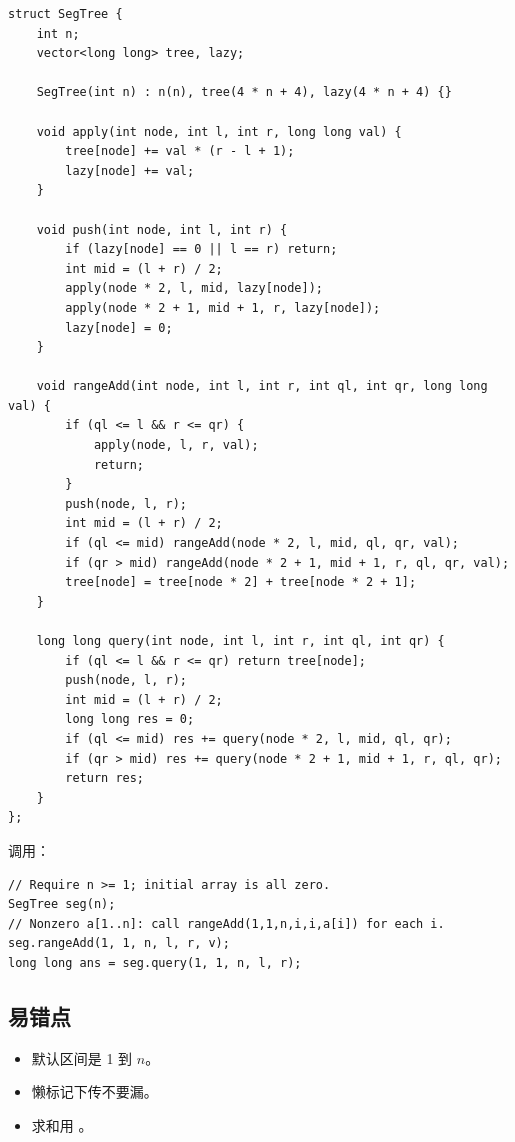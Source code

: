 \begin{lstlisting}
struct SegTree {
    int n;
    vector<long long> tree, lazy;

    SegTree(int n) : n(n), tree(4 * n + 4), lazy(4 * n + 4) {}

    void apply(int node, int l, int r, long long val) {
        tree[node] += val * (r - l + 1);
        lazy[node] += val;
    }

    void push(int node, int l, int r) {
        if (lazy[node] == 0 || l == r) return;
        int mid = (l + r) / 2;
        apply(node * 2, l, mid, lazy[node]);
        apply(node * 2 + 1, mid + 1, r, lazy[node]);
        lazy[node] = 0;
    }

    void rangeAdd(int node, int l, int r, int ql, int qr, long long val) {
        if (ql <= l && r <= qr) {
            apply(node, l, r, val);
            return;
        }
        push(node, l, r);
        int mid = (l + r) / 2;
        if (ql <= mid) rangeAdd(node * 2, l, mid, ql, qr, val);
        if (qr > mid) rangeAdd(node * 2 + 1, mid + 1, r, ql, qr, val);
        tree[node] = tree[node * 2] + tree[node * 2 + 1];
    }

    long long query(int node, int l, int r, int ql, int qr) {
        if (ql <= l && r <= qr) return tree[node];
        push(node, l, r);
        int mid = (l + r) / 2;
        long long res = 0;
        if (ql <= mid) res += query(node * 2, l, mid, ql, qr);
        if (qr > mid) res += query(node * 2 + 1, mid + 1, r, ql, qr);
        return res;
    }
};
\end{lstlisting}

调用：

\begin{lstlisting}
// Require n >= 1; initial array is all zero.
SegTree seg(n);
// Nonzero a[1..n]: call rangeAdd(1,1,n,i,i,a[i]) for each i.
seg.rangeAdd(1, 1, n, l, r, v);
long long ans = seg.query(1, 1, n, l, r);
\end{lstlisting}

\subsection{易错点}

\begin{itemize}
  \item 默认区间是 1 到 $n$。
  \item 懒标记下传不要漏。
  \item 求和用 。
\end{itemize}

